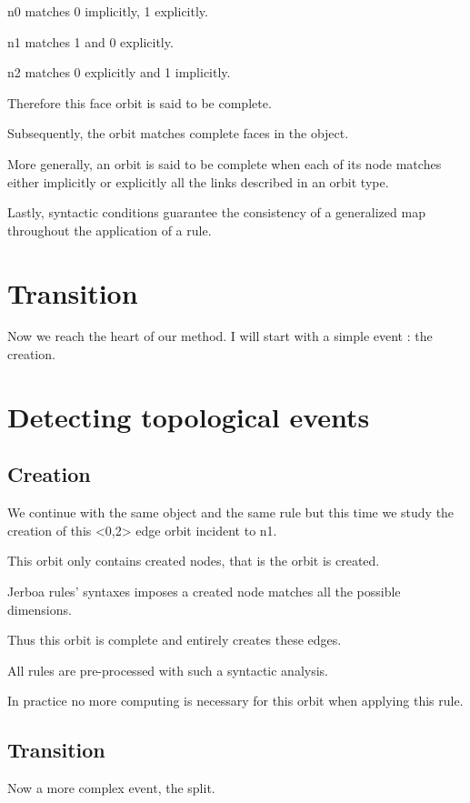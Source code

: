 \documentclass[11pt]{article}
\begin{document}
n0 matches 0 implicitly, 1 explicitly.

n1 matches 1 and 0 explicitly.

n2 matches 0 explicitly and 1 implicitly.

Therefore this face orbit is said to be complete.

Subsequently, the orbit matches complete faces in the object.

More generally, an orbit is said to be complete when each of its node matches
either implicitly or explicitly all the links described in an orbit type.

Lastly, syntactic conditions guarantee the consistency of a generalized map
throughout the application of a rule.

\section{Transition}
\label{sec:orgf8a0d67}
Now we reach the heart of our method. I will start with a simple event : the
creation.

\section{Detecting topological events}
\label{sec:org99eaa79}

\subsection{Creation}
\label{sec:orgddf39e6}

We continue with the same object and the same rule but this time we study the
creation of this <0,2> edge orbit incident to n1.

This orbit only contains created nodes, that is the orbit is created.

Jerboa rules' syntaxes imposes a created node matches all the possible
dimensions.

Thus this orbit is complete and entirely creates these edges.

All rules are pre-processed with such a syntactic analysis.

In practice no more computing is necessary for this orbit when applying this
rule.

\subsection{Transition}
\label{sec:org19ef56e}
Now a more complex event, the split.
\end{document}
